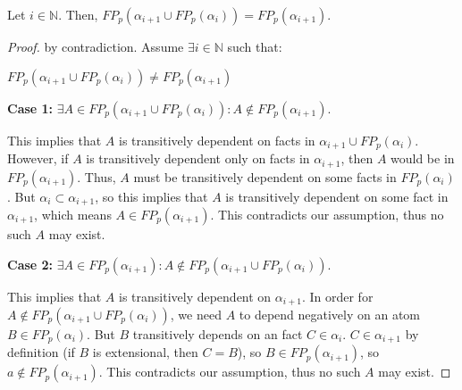 \begin{lemma}
%
Let $i \in \mathbb{N}$.  Then, $FP_p(\alpha_{i+1} \cup FP_p(\alpha_i)) =
FP_p(\alpha_{i+1})$.
%
\end{lemma}


\begin{proof}



by contradiction. Assume $\exists i \in \mathbb{N}$ such that:

$FP_p(\alpha_{i+1} \cup FP_p(\alpha_i)) \neq FP_p(\alpha_{i+1})$

{\bf Case 1:} $\exists A \in FP_p(\alpha_{i+1} \cup FP_p(\alpha_i)) : A \not\in FP_p(\alpha_{i+1}).$

This implies that $A$ is transitively dependent on facts in $\alpha_{i+1} \cup
FP_p(\alpha_i)$.  However, if $A$ is transitively dependent only on facts in
$\alpha_{i+1}$, then $A$ would be in $FP_p(\alpha_{i+1})$.  Thus, $A$ must be
transitively dependent on some facts in $FP_p(\alpha_{i})$.  But $\alpha_{i}
\subset \alpha_{i+1}$, so this implies that $A$ is transitively dependent on
some fact in $\alpha_{i+1}$, which means $A \in FP_p(\alpha_{i+1})$.  This
contradicts our assumption, thus no such $A$ may exist.

{\bf Case 2:} $\exists A \in FP_p(\alpha_{i+1}) : A \not\in FP_p(\alpha_{i+1} \cup FP_p(\alpha_i)).$

This implies that $A$ is transitively dependent on $\alpha_{i+1}$.  In order
for $A \not\in FP_p(\alpha_{i+1} \cup FP_p(\alpha_i))$, we need $A$ to depend
negatively on an atom $B \in FP_p(\alpha_i)$.  But $B$ transitively depends on
an fact $C \in \alpha_i$.  $C \in \alpha_{i+1}$ by definition (if $B$ is
extensional, then $C=B$), so $B \in FP_p(\alpha_{i+1})$, so $a \not\in
FP_p(\alpha_{i+1})$.  This contradicts our assumption, thus no such $A$ may
exist.



\end{proof}
